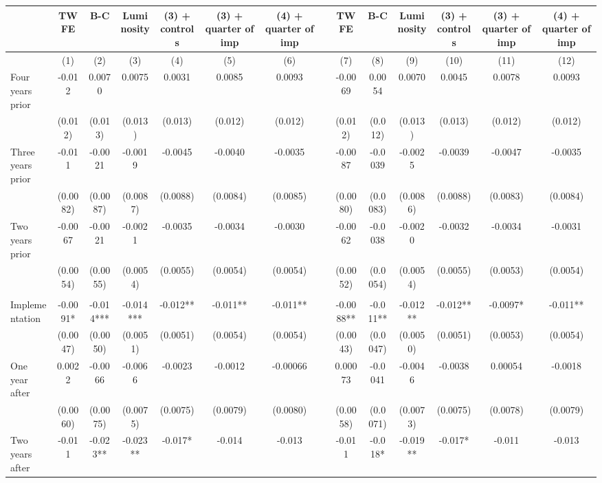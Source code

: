 \begin{tabular}{lccccccccccccc}
\toprule
      & TWFE  & B-C   & Luminosity & (3) + controls & (3) + quarter of imp & (4) + quarter of imp &       & TWFE  & B-C   & Luminosity & (3) + controls & (3) + quarter of imp & (4) + quarter of imp \\
\midrule
      & (1)   & (2)   & (3)   & (4)   & (5)   & (6)   &       & (7)   & (8)   & (9)   & (10)  & (11)  & (12) \\
\midrule
\midrule
Four years prior & -0.012 & 0.0070 & 0.0075 & 0.0031 & 0.0085 & 0.0093 &       & -0.0069 & 0.0054 & 0.0070 & 0.0045 & 0.0078 & 0.0093 \\
      & (0.012) & (0.013) & (0.013) & (0.013) & (0.012) & (0.012) &       & (0.012) & (0.012) & (0.013) & (0.013) & (0.012) & (0.012) \\
Three years prior & -0.011 & -0.0021 & -0.0019 & -0.0045 & -0.0040 & -0.0035 &       & -0.0087 & -0.0039 & -0.0025 & -0.0039 & -0.0047 & -0.0035 \\
      & (0.0082) & (0.0087) & (0.0087) & (0.0088) & (0.0084) & (0.0085) &       & (0.0080) & (0.0083) & (0.0086) & (0.0088) & (0.0083) & (0.0084) \\
Two years prior & -0.0067 & -0.0021 & -0.0021 & -0.0035 & -0.0034 & -0.0030 &       & -0.0062 & -0.0038 & -0.0020 & -0.0032 & -0.0034 & -0.0031 \\
      & (0.0054) & (0.0055) & (0.0054) & (0.0055) & (0.0054) & (0.0054) &       & (0.0052) & (0.0054) & (0.0054) & (0.0055) & (0.0053) & (0.0054) \\
      &       &       &       &       &       &       &       &       &       &       &       &       &  \\
Implementation & -0.0091* & -0.014*** & -0.014*** & -0.012** & -0.011** & -0.011** &       & -0.0088** & -0.011** & -0.012** & -0.012** & -0.0097* & -0.011** \\
      & (0.0047) & (0.0050) & (0.0051) & (0.0051) & (0.0054) & (0.0054) &       & (0.0043) & (0.0047) & (0.0050) & (0.0051) & (0.0053) & (0.0054) \\
One year after & 0.0022 & -0.0066 & -0.0066 & -0.0023 & -0.0012 & -0.00066 &       & 0.00073 & -0.0041 & -0.0046 & -0.0038 & 0.00054 & -0.0018 \\
      & (0.0060) & (0.0075) & (0.0075) & (0.0075) & (0.0079) & (0.0080) &       & (0.0058) & (0.0071) & (0.0073) & (0.0075) & (0.0078) & (0.0079) \\
Two years after & -0.011 & -0.023** & -0.023** & -0.017* & -0.014 & -0.013 &       & -0.011 & -0.018* & -0.019** & -0.017* & -0.011 & -0.013 \\

\end{tabular}

